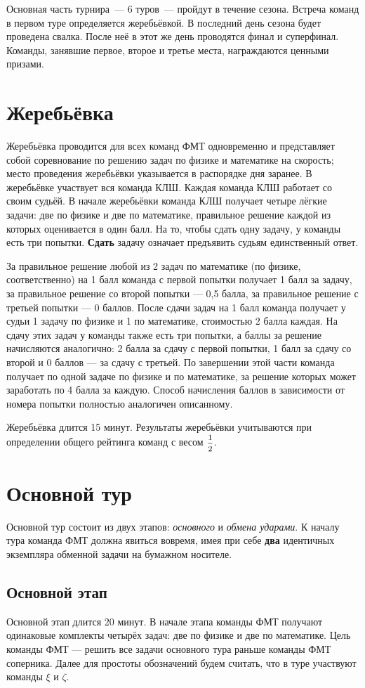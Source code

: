 \documentclass[12pt,a4paper]{article}
\begin{document}
Основная часть турнира~--- 6 туров~--- пройдут в течение сезона. Встреча команд в первом туре определяется жеребьёвкой. В последний день сезона будет проведена свалка. После неё в этот же день проводятся финал и суперфинал. Команды, занявшие первое, второе и третье места, награждаются ценными призами.

\section{Жеребьёвка}
Жеребьёвка проводится для всех команд ФМТ одновременно и представляет собой соревнование по решению задач по физике и математике на скорость; место проведения жеребьёвки указывается в распорядке дня заранее. В жеребьёвке участвует вся команда КЛШ. Каждая команда КЛШ работает со своим судьёй. В начале жеребьёвки команда КЛШ получает четыре лёгкие задачи: две по физике и две по математике, правильное решение каждой из которых оценивается в один балл. На то, чтобы сдать одну задачу, у команды есть три попытки. \textbf{Сдать} задачу означает предъявить судьям единственный ответ.

За правильное решение любой из 2 задач по математике (по физике, соответственно) на 1 балл команда с первой попытки получает 1 балл за задачу, за правильное решение со второй попытки --- 0,5 балла, за правильное решение с третьей попытки --- 0 баллов. После сдачи задач на 1 балл команда получает у судьи 1 задачу по физике и 1 по математике, стоимостью 2 балла каждая. На сдачу этих задач у команды также есть три попытки, а баллы за решение начисляются аналогично: 2 балла за сдачу с первой попытки, 1 балл за сдачу со второй и 0 баллов --- за сдачу с третьей. По завершении этой части команда получает по одной задаче по физике и по математике, за решение которых может заработать по 4 балла за каждую. Способ начисления баллов в зависимости от номера попытки полностью аналогичен описанному.

Жеребьёвка длится 15 минут. Результаты жеребьёвки учитываются при определении общего рейтинга команд с весом $\mfrac{1}{2}$.

\section{Основной тур}
Основной тур состоит из двух этапов: \textsl{основного} и \textsl{обмена ударами}. К началу тура команда ФМТ должна явиться вовремя, имея при себе {\bf два} идентичных экземпляра обменной задачи на бумажном носителе.

\subsection{Основной этап}
Основной этап длится 20 минут. В начале этапа команды ФМТ получают одинаковые комплекты четырёх задач: две по физике и две по математике. Цель команды ФМТ --- решить все задачи основного тура раньше команды ФМТ соперника. Далее для простоты обозначений будем считать, что в туре участвуют команды $\xi$ и $\zeta$.
\end{document}
